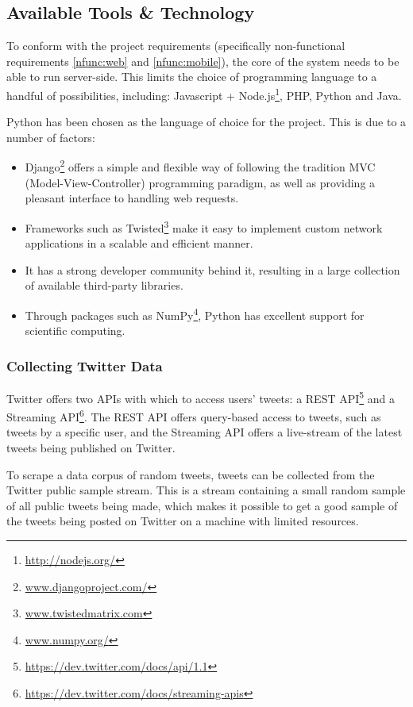 \documentclass[12pt,a4paper]{article}
\begin{document}
\subsection{Available Tools \& Technology}

To conform with the project requirements (specifically non-functional requirements \ref{nfunc:web} and \ref{nfunc:mobile}), the core of the system needs to be able to run server-side. This limits the choice of programming language to a handful of possibilities, including: Javascript + Node.js\footnote{\url{http://nodejs.org/}}, PHP, Python and Java.

Python has been chosen as the language of choice for the project. This is due to a number of factors:
\begin{itemize}
    \item Django\footnote{\url{www.djangoproject.com/}} offers a simple and flexible way of following the tradition MVC (Model-View-Controller) programming paradigm, as well as providing a pleasant interface to handling web requests.
    \item Frameworks such as Twisted\footnote{\url{www.twistedmatrix.com}} make it easy to implement custom network applications in a scalable and efficient manner.
    \item It has a strong developer community behind it, resulting in a large collection of available third-party libraries.
    \item Through packages such as NumPy\footnote{\url{www.numpy.org/}}, Python has excellent support for scientific computing.
\end{itemize}
        
\subsubsection{Collecting Twitter Data}
Twitter offers two APIs with which to access users' tweets: a REST API\footnote{\url{https://dev.twitter.com/docs/api/1.1}} and a Streaming API\footnote{\url{https://dev.twitter.com/docs/streaming-apis}}. The REST API offers query-based access to tweets, such as tweets by a specific user, and the Streaming API offers a live-stream of the latest tweets being published on Twitter.

To scrape a data corpus of random tweets, tweets can be collected from the Twitter public sample stream. This is a stream containing a small random sample of all public tweets being made, which makes it possible to get a good sample of the tweets being posted on Twitter on a machine with limited resources.
\end{document}
